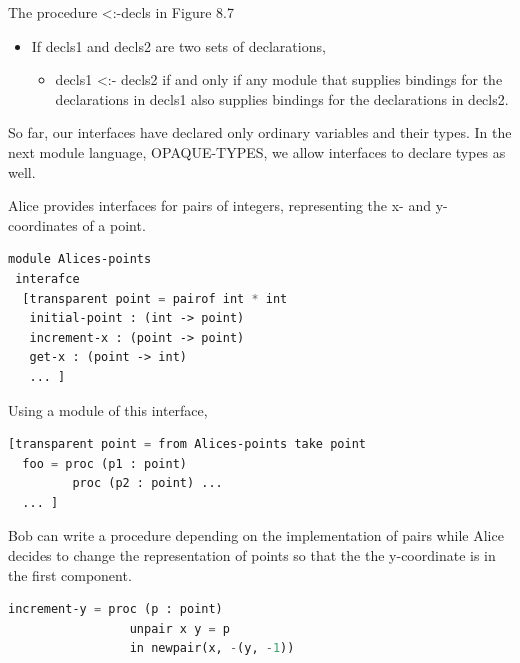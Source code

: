 \documentclass{article}
\begin{document}
\begin{huge}

The procedure \textless:-decls in Figure 8.7
\begin{itemize}
\item If decls1 and decls2 are two sets of declarations, 
\begin{itemize}
\item decls1 \textless:- decls2 if and only if any module that supplies bindings for the declarations in decls1 also supplies bindings for the declarations in decls2.
\end{itemize}
\end{itemize}



So far, our interfaces have declared only ordinary variables and their types. In the next module language, OPAQUE-TYPES, we allow interfaces to declare types as well.


Alice provides interfaces for pairs of integers, representing the x- and y- coordinates of a point.

\begin{lstlisting}[language=Lisp]
module Alices-points
 interafce
  [transparent point = pairof int * int
   initial-point : (int -> point)
   increment-x : (point -> point)
   get-x : (point -> int)
   ... ]
\end{lstlisting}   

Using a module of this interface,
\begin{lstlisting}[language=Lisp]
[transparent point = from Alices-points take point
  foo = proc (p1 : point)
         proc (p2 : point) ...
  ... ]
\end{lstlisting}   


Bob can write a procedure depending on the implementation of pairs while Alice decides to change the representation of points so that the the y-coordinate is in the first component.

\begin{lstlisting}[language=Lisp]
     increment-y = proc (p : point)
                 unpair x y = p
                 in newpair(x, -(y, -1))
\end{lstlisting}   


\end{huge}
\end{document}
